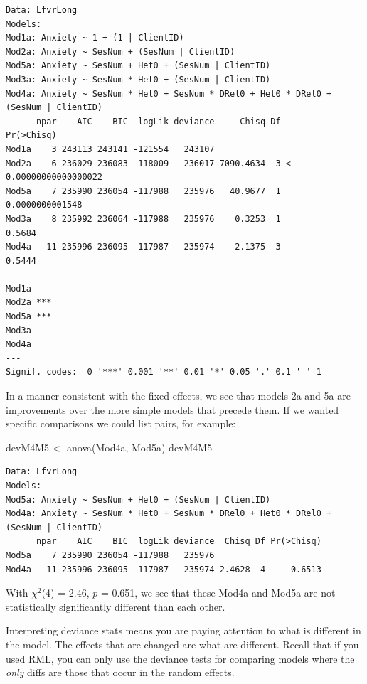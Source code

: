 \documentclass[
  11pt,
]{book}
\newenvironment{Shaded}{\begin{snugshade}}{\end{snugshade}}
\newcommand{\FunctionTok}[1]{\textcolor[rgb]{0.00,0.00,0.00}{#1}}
\newcommand{\NormalTok}[1]{#1}
\newcommand{\OtherTok}[1]{\textcolor[rgb]{0.56,0.35,0.01}{#1}}
\begin{document}
\begin{verbatim}
Data: LfvrLong
Models:
Mod1a: Anxiety ~ 1 + (1 | ClientID)
Mod2a: Anxiety ~ SesNum + (SesNum | ClientID)
Mod5a: Anxiety ~ SesNum + Het0 + (SesNum | ClientID)
Mod3a: Anxiety ~ SesNum * Het0 + (SesNum | ClientID)
Mod4a: Anxiety ~ SesNum * Het0 + SesNum * DRel0 + Het0 * DRel0 + (SesNum | ClientID)
      npar    AIC    BIC  logLik deviance     Chisq Df            Pr(>Chisq)
Mod1a    3 243113 243141 -121554   243107                                   
Mod2a    6 236029 236083 -118009   236017 7090.4634  3 < 0.00000000000000022
Mod5a    7 235990 236054 -117988   235976   40.9677  1       0.0000000001548
Mod3a    8 235992 236064 -117988   235976    0.3253  1                0.5684
Mod4a   11 235996 236095 -117987   235974    2.1375  3                0.5444
         
Mod1a    
Mod2a ***
Mod5a ***
Mod3a    
Mod4a    
---
Signif. codes:  0 '***' 0.001 '**' 0.01 '*' 0.05 '.' 0.1 ' ' 1
\end{verbatim}

In a manner consistent with the fixed effects, we see that models 2a and 5a are improvements over the more simple models that precede them. If we wanted specific comparisons we could list pairs, for example:

\begin{Shaded}
\begin{Highlighting}[]
\NormalTok{devM4M5 }\OtherTok{\textless{}{-}} \FunctionTok{anova}\NormalTok{(Mod4a, Mod5a) }
\NormalTok{devM4M5}
\end{Highlighting}
\end{Shaded}

\begin{verbatim}
Data: LfvrLong
Models:
Mod5a: Anxiety ~ SesNum + Het0 + (SesNum | ClientID)
Mod4a: Anxiety ~ SesNum * Het0 + SesNum * DRel0 + Het0 * DRel0 + (SesNum | ClientID)
      npar    AIC    BIC  logLik deviance  Chisq Df Pr(>Chisq)
Mod5a    7 235990 236054 -117988   235976                     
Mod4a   11 235996 236095 -117987   235974 2.4628  4     0.6513
\end{verbatim}

With \(\chi^2\)(4) = 2.46, \(p\) = 0.651, we see that these Mod4a and Mod5a are not statistically significantly different than each other.

Interpreting deviance stats means you are paying attention to what is different in the model. The effects that are changed are what are different. Recall that if you used RML, you can only use the deviance tests for comparing models where the \emph{only} diffs are those that occur in the random effects.
\end{document}
